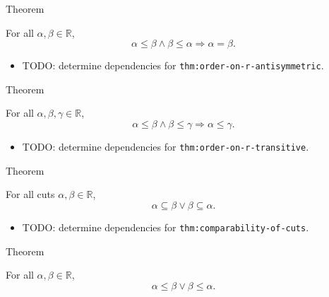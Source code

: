 \begin{theorembox}{Theorem}
\begin{theorem}
\label{thm:order-on-r-antisymmetric}
For all $\alpha,\beta\in\mathbb{R}$,
\[
\alpha\le\beta\land\beta\le\alpha \Longrightarrow \alpha=\beta.
\]
\end{theorem}
\end{theorembox}

\begin{dependencies}
\begin{itemize}
  \item TODO: determine dependencies for \texttt{thm:order-on-r-antisymmetric}.
\end{itemize}
\end{dependencies}

\begin{theorembox}{Theorem}
\begin{theorem}
\label{thm:order-on-r-transitive}
For all $\alpha,\beta,\gamma\in\mathbb{R}$,
\[
\alpha\le\beta\land\beta\le\gamma \Longrightarrow \alpha\le\gamma.
\]
\end{theorem}
\end{theorembox}

\begin{dependencies}
\begin{itemize}
  \item TODO: determine dependencies for \texttt{thm:order-on-r-transitive}.
\end{itemize}
\end{dependencies}

\begin{theorembox}{Theorem}
\begin{theorem}
\label{thm:comparability-of-cuts}
For all cuts $\alpha,\beta\in\mathbb{R}$,
\[
\alpha\subseteq\beta \lor \beta\subseteq\alpha.
\]
\end{theorem}
\end{theorembox}

\begin{dependencies}
\begin{itemize}
  \item TODO: determine dependencies for \texttt{thm:comparability-of-cuts}.
\end{itemize}
\end{dependencies}

\begin{theorembox}{Theorem}
\begin{theorem}
\label{thm:order-on-r-total}
For all $\alpha,\beta\in\mathbb{R}$,
\[
\alpha\le\beta\lor\beta\le\alpha.
\]
\end{theorem}
\end{theorembox}

